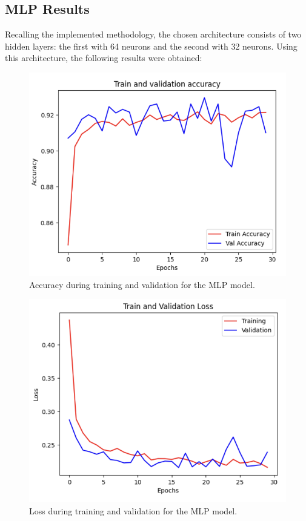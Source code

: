 \subsection{MLP Results}

Recalling the implemented methodology, the chosen architecture consists of two hidden layers: the first with 64 neurons and the second with 32 neurons. Using this architecture, the following results were obtained:

\begin{figure}[H]
    \centering
    \includegraphics[width=\linewidth]{images/mlp_accuracy_training_And_Validation.png}
    \caption{Accuracy during training and validation for the MLP model.}
    \label{fig:mlp_accuracy_training_validation}
\end{figure}

\begin{figure}[H]
    \centering
    \includegraphics[width=\linewidth]{images/mlpTrainAndValidationLoss.png}
    \caption{Loss during training and validation for the MLP model.}
    \label{fig:mlp_loss_training_validation}
\end{figure}

